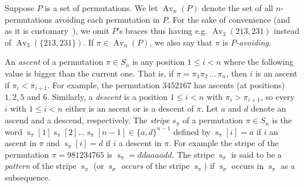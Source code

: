 \documentclass[a4paper]{llncs}
\DeclareMathOperator{\AV}{Av}
\DeclareMathOperator{\stripea}{s}
\newcommand{\stripe}[2]{\stripea_{{#1}}[{#2}]}
\newcommand{\stripew}[1]{\stripea_{{#1}}}
\newcommand{\dstep}{d}
\newcommand{\ustep}{a}
\begin{document}
Suppose $P$ is a set of permutations. We let $\AV_n(P)$ denote the
set of all $n$-permutations avoiding each permutation in $P$.
For the sake of convenience
(and as it is customary~\cite{Kitaev:book:2011}), we omit $P$'s braces thus having
e.g. $\AV_3(213,231)$ instead of
$\AV_3(\{213,231\})$.
If $\pi \in \AV_n(P)$, we also say that $\pi$ is
\emph{$P$-avoiding}.

An \emph{ascent} of a permutation $\pi \in S_n$ is any position
$1 \leq i < n$ where the following value is bigger than the current one.
That is, if $\pi = \pi_1\pi_2\,\ldots\,\pi_n$, then
$i$ is an ascent if $\pi_i < \pi_{i+1}$.
For example, the permutation
$345216$7 has ascents (at positions) $1,2,5$ and $6$.
Similarly, a \emph{descent} is a position
$1 \leq i < n$ with $\pi_i > \pi_{i+1}$,
so every $i$ with $1 \leq i < n$ either is an ascent or is a descent of
$\pi$.
Let $\ustep$ and $\dstep$ denote an ascend and a descend, respectively.
The \emph{stripe} $s_\pi$ of a permutation $\pi \in S_n$ is the word
$\stripe{\pi}{1} \stripe{\pi}{2} \ldots \stripe{\pi}{n-1} \in \{\ustep,\dstep\}^{n-1}$
defined by
$ \stripe{\pi}{i}= \ustep$ if $i$ an ascent in $\pi$ and
$\stripe{\pi}{i} = \dstep$ if $i$ a descent in $\pi$.
For example the stripe of the permutation
$\pi = 981234765$
is $\stripew{\pi} = \dstep\dstep\ustep\ustep\ustep\ustep\dstep\dstep$.
The stripe $\stripew{\sigma}$ is said to be a \emph{pattern} of the stripe $\stripew{\pi}$
(or $\stripew{\sigma}$ \emph{occurs} of the stripe $\stripew{\pi}$)
if $\stripew{\sigma}$ occurs in $\stripew{\pi}$ as a subsequence.
\end{document}
